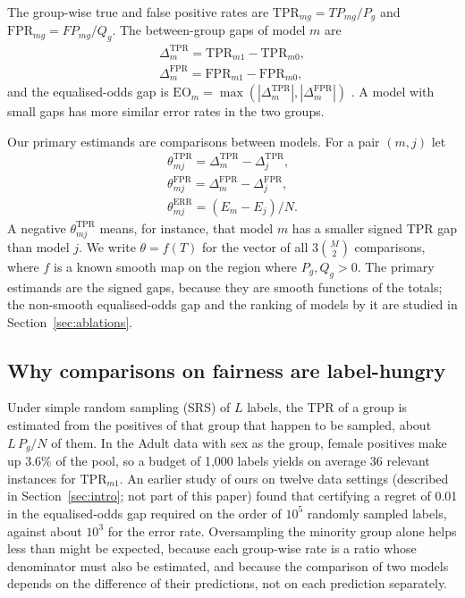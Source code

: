 The group-wise true and false positive rates are $\mathrm{TPR}_{mg}=TP_{mg}/P_g$ and $\mathrm{FPR}_{mg}=FP_{mg}/Q_g$. The between-group gaps of model $m$ are
\begin{equation}
\begin{gathered}
\Delta^{\mathrm{TPR}}_m=\mathrm{TPR}_{m1}-\mathrm{TPR}_{m0},\\
\Delta^{\mathrm{FPR}}_m=\mathrm{FPR}_{m1}-\mathrm{FPR}_{m0},
\end{gathered}
\end{equation}
and the equalised-odds gap is $\mathrm{EO}_m=\max(|\Delta^{\mathrm{TPR}}_m|,|\Delta^{\mathrm{FPR}}_m|)$ \citep{hardt2016}. A model with small gaps has more similar error rates in the two groups.

Our primary estimands are comparisons between models. For a pair $(m,j)$ let
\begin{equation}\label{eq:theta}
\begin{gathered}
\theta^{\mathrm{TPR}}_{mj}=\Delta^{\mathrm{TPR}}_m-\Delta^{\mathrm{TPR}}_j,\\
\theta^{\mathrm{FPR}}_{mj}=\Delta^{\mathrm{FPR}}_m-\Delta^{\mathrm{FPR}}_j,\\
\theta^{\mathrm{ERR}}_{mj}=(E_m-E_j)/N .
\end{gathered}
\end{equation}
A negative $\theta^{\mathrm{TPR}}_{mj}$ means, for instance, that model $m$ has a smaller signed TPR gap than model $j$. We write $\theta=f(T)$ for the vector of all $3\binom{M}{2}$ comparisons, where $f$ is a known smooth map on the region where $P_g,Q_g>0$. The primary estimands are the signed gaps, because they are smooth functions of the totals; the non-smooth equalised-odds gap and the ranking of models by it are studied in Section~\ref{sec:ablations}.

\subsection{Why comparisons on fairness are label-hungry}
Under simple random sampling (SRS) of $L$ labels, the TPR of a group is estimated from the positives of that group that happen to be sampled, about $L\,P_g/N$ of them. In the Adult data with sex as the group, female positives make up 3.6\% of the pool, so a budget of 1,000 labels yields on average 36 relevant instances for $\mathrm{TPR}_{m1}$. An earlier study of ours on twelve data settings (described in Section~\ref{sec:intro}; not part of this paper) found that certifying a regret of 0.01 in the equalised-odds gap required on the order of $10^5$ randomly sampled labels, against about $10^3$ for the error rate. Oversampling the minority group alone helps less than might be expected, because each group-wise rate is a ratio whose denominator must also be estimated, and because the comparison of two models depends on the difference of their predictions, not on each prediction separately.

